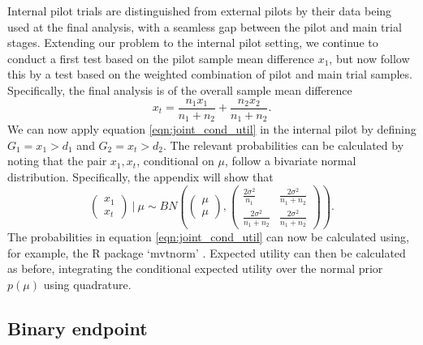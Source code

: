 \documentclass[sagev]{sagej}
\begin{document}
Internal pilot trials are distinguished from external pilots by their data being used at the final analysis, with a seamless gap between the pilot and main trial stages. Extending our problem to the internal pilot setting, we continue to conduct a first test based on the pilot sample mean difference $x_1$, but now follow this by a test based on the weighted combination of pilot and main trial samples. Specifically, the final analysis is of the overall sample mean difference
$$
x_t = \frac{n_1 x_1}{n_1 + n_2} + \frac{n_2 x_2}{n_1 + n_2}.
$$
We can now apply equation \ref{eqn:joint_cond_util} in the internal pilot by defining $G_1 = x_1 > d_1$ and $G_2 = x_t > d_2$. The relevant probabilities can be calculated by noting that the pair $x_1, x_t$, conditional on $\mu$, follow a bivariate normal distribution. Specifically, the appendix will show that
$$
\begin{pmatrix}
x_1 \\
x_t
\end{pmatrix} ~|~ \mu
\sim BN\left( 
\begin{pmatrix}
\mu \\
\mu
\end{pmatrix},
\begin{pmatrix}
\frac{2\sigma^2}{n_1} & \frac{2\sigma^2}{n_1 + n_2} \\
\frac{2\sigma^2}{n_1 + n_2} & \frac{2\sigma^2}{n_1 + n_2}
\end{pmatrix} \right).
$$
The probabilities in equation \ref{eqn:joint_cond_util} can now be calculated using, for example, the R package `mvtnorm' \cite{Genz2017}. Expected utility can then be calculated as before, integrating the conditional expected utility over the normal prior $p(\mu)$ using quadrature.


\subsection{Binary endpoint}
\end{document}
